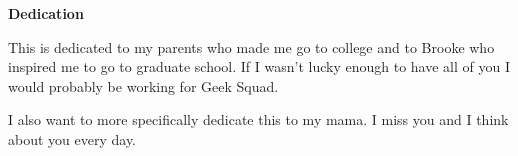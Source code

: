\begin{doublespace}
  \begin{center}
    \textbf{Dedication}
  \end{center}
This is dedicated to my parents who made me go to college and to Brooke who inspired me to go to graduate school.  If I wasn't lucky enough to have all of you I would probably be working for Geek Squad.
  
I also want to more specifically dedicate this to my mama.  I miss you and I think about you every day.
\end{doublespace}